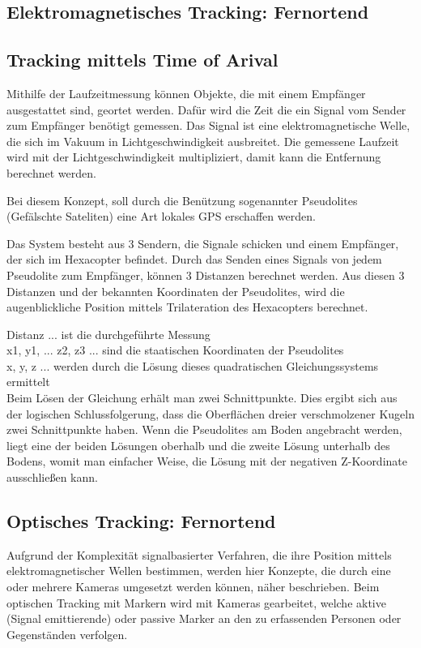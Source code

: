     \subsection{Elektromagnetisches Tracking: Fernortend}

      \subsection*{Tracking mittels Time of Arival}
      Mithilfe der Laufzeitmessung können Objekte, die mit einem Empfänger ausgestattet sind, geortet werden. Dafür wird die Zeit die ein Signal vom Sender zum Empfänger benötigt gemessen. Das Signal ist eine elektromagnetische Welle, die sich im Vakuum in Lichtgeschwindigkeit ausbreitet. Die gemessene Laufzeit wird mit der Lichtgeschwindigkeit multipliziert, damit kann die Entfernung berechnet werden.

      Bei diesem Konzept, soll durch die Benützung sogenannter Pseudolites (Gefälschte Sateliten) eine Art lokales GPS erschaffen werden.

      Das System besteht aus 3 Sendern, die Signale schicken und einem Empfänger, der sich im Hexacopter befindet.
      Durch das Senden eines Signals von jedem Pseudolite zum Empfänger, können 3 Distanzen berechnet werden.
      Aus diesen 3 Distanzen und der bekannten Koordinaten der Pseudolites, wird die augenblickliche Position mittels Trilateration des Hexacopters berechnet.


      Distanz ... ist die durchgeführte Messung\\
      x1, y1, ... z2, z3 ... sind die staatischen Koordinaten der Pseudolites \\
      x, y, z ... werden durch die Lösung dieses quadratischen Gleichungssystems ermittelt \\

      Beim Lösen der Gleichung erhält man zwei Schnittpunkte. Dies ergibt sich aus der logischen Schlussfolgerung, dass die Oberflächen dreier verschmolzener Kugeln zwei Schnittpunkte haben.
      Wenn die Pseudolites am Boden angebracht werden, liegt eine der beiden Lösungen oberhalb und die zweite Lösung unterhalb des Bodens, womit man einfacher Weise, die Lösung mit der negativen Z-Koordinate ausschließen kann.

    \subsection{Optisches Tracking: Fernortend}
    Aufgrund der Komplexität signalbasierter Verfahren, die ihre Position mittels elektromagnetischer Wellen bestimmen, werden hier Konzepte, die durch eine oder mehrere Kameras umgesetzt werden können, näher beschrieben. Beim optischen Tracking mit Markern wird mit Kameras gearbeitet, welche aktive (Signal emittierende) oder passive Marker an den zu erfassenden Personen oder Gegenständen verfolgen.


